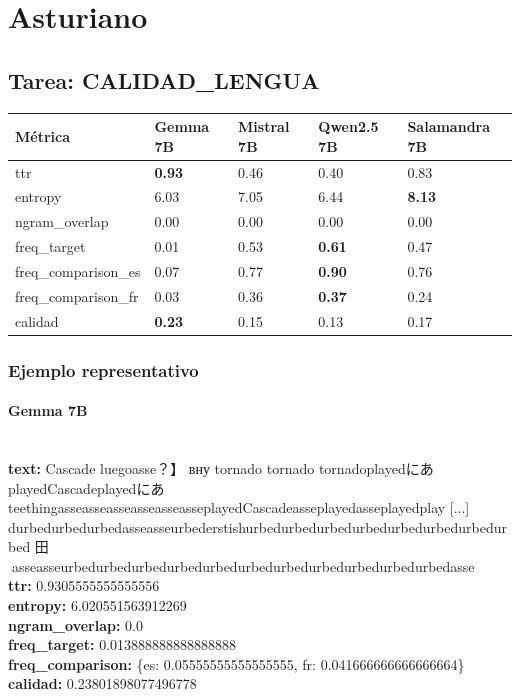 \section{Asturiano}

\subsection{Tarea: CALIDAD\_LENGUA}\label{tarea-calidad_lengua}
{\def\LTcaptype{none}
\begin{longtable}[]{@{}lllll@{}}
\toprule\noalign{}
Métrica & Gemma 7B & Mistral 7B & Qwen2.5 7B & Salamandra 7B \\
\midrule\noalign{}
\endhead
\bottomrule\noalign{}
\endlastfoot
ttr & \textbf{0.93} & 0.46 & 0.40 & 0.83 \\
entropy & 6.03 & 7.05 & 6.44 & \textbf{8.13} \\
ngram\_overlap & 0.00 & 0.00 & 0.00 & 0.00 \\
freq\_target & 0.01 & 0.53 & \textbf{0.61} & 0.47 \\
freq\_comparison\_es & 0.07 & 0.77 & \textbf{0.90} & 0.76 \\
freq\_comparison\_fr & 0.03 & 0.36 & \textbf{0.37} & 0.24 \\
calidad & \textbf{0.23} & 0.15 & 0.13 & 0.17 \\
\end{longtable}}

\subsubsection{Ejemplo representativo}

\paragraph{Gemma 7B}~\\
\textbf{text:} Cascade luegoasse？】 вну tornado tornado tornadoplayedにあplayedCascadeplayedにあ teethingasseasseasseasseasseasseplayedCascadeasseplayedasseplayedplay [...] durbedurbedurbedasseasseurbederstishurbedurbedurbedurbedurbedurbedurbedurbed 田asseasseurbedurbedurbedurbedurbedurbedurbedurbedurbedurbedurbedasse\\
\textbf{ttr:} 0.9305555555555556\\
\textbf{entropy:} 6.020551563912269\\
\textbf{ngram\_overlap:} 0.0\\
\textbf{freq\_target:} 0.013888888888888888\\
\textbf{freq\_comparison:} \{\textquotesingle{}es\textquotesingle{}: 0.05555555555555555, \textquotesingle{}fr\textquotesingle{}: 0.041666666666666664\}\\
\textbf{calidad:} 0.23801898077496778\\

